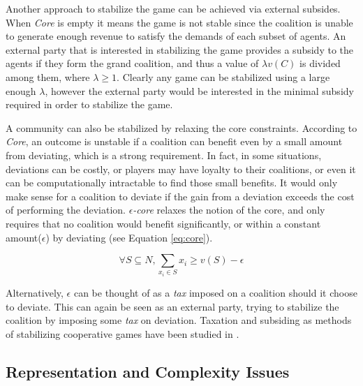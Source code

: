         Another approach to stabilize the game can be achieved via external subsides. When \emph{Core} is empty it means the game is not stable since the coalition is unable to generate enough revenue to satisfy the demands of each subset of agents. An external party that is interested in stabilizing the game provides a subsidy to the agents if they form the grand coalition, and thus a value of $\lambda v(C)$ is divided among them, where $\lambda \geq 1$. Clearly any game can be stabilized using a large enough $\lambda$, however the external party would be interested in the minimal subsidy required in order to stabilize the game.

        A community can also be stabilized by relaxing the core constraints. According to \emph{Core}, an outcome is unstable if a coalition can benefit even by a small amount from deviating, which is a strong requirement. In fact, in some situations, deviations can be costly, or players may have loyalty to their coalitions, or even it can be computationally intractable to find those small benefits. It would only make sense for a coalition to deviate if the gain from a deviation exceeds the cost of performing the deviation. \emph{$\epsilon$-core} relaxes the notion of the core, and only requires that no coalition would benefit significantly, or within a constant amount($\epsilon$) by deviating (see Equation \ref{eq:core}).

           \begin{equation}\label{eq:core2}
               \forall S \subseteq N, \sum_{x_i \in S} x_i \geq v(S) - \epsilon
           \end{equation}

        Alternatively, $\epsilon$ can be thought of as a \emph{tax} imposed on a coalition should it choose to deviate. This can again be seen as an external party, trying to stabilize the coalition by imposing some \emph{tax} on deviation. Taxation and subsiding as methods of stabilizing cooperative games have been studied in \cite{RePEc:spr:jogath:v:38:y:2009:i:1:p:3-16, Bachrach:2009:CSC:1692490.1692502, conf/ijcai/MeirRM11}.


        \subsection{Representation and Complexity Issues}\label{sec:CWSArchitecture}

